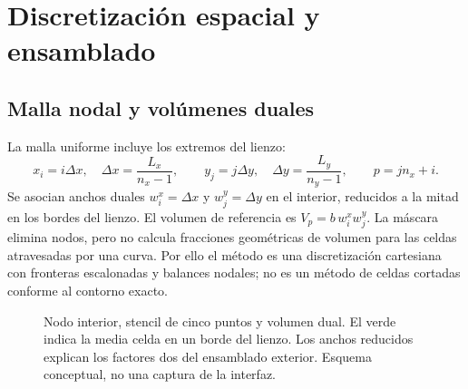 \documentclass[11pt,a4paper]{article}
\begin{document}
\FloatBarrier
\section{Discretización espacial y ensamblado}
\label{sec:space}
\subsection{Malla nodal y volúmenes duales}
La malla uniforme incluye los extremos del lienzo:
\begin{equation}
 x_i=i\Delta x,\quad \Delta x=\frac{L_x}{n_x-1},\qquad
 y_j=j\Delta y,\quad \Delta y=\frac{L_y}{n_y-1},\qquad p=j n_x+i.
\end{equation}
Se asocian anchos duales $w^x_i=\Delta x$ y $w^y_j=\Delta y$ en el interior,
reducidos a la mitad en los bordes del lienzo. El volumen de referencia es
$V_p=b\,w^x_iw^y_j$. La máscara elimina nodos, pero no calcula fracciones
geométricas de volumen para las celdas atravesadas por una curva. Por ello el
método es una discretización cartesiana con fronteras escalonadas y balances
nodales; no es un método de celdas cortadas conforme al contorno exacto.

\begin{figure}[htbp]\centering
{}
\caption{Nodo interior, stencil de cinco puntos y volumen dual. El verde indica
la media celda en un borde del lienzo. Los anchos reducidos explican los
factores dos del ensamblado exterior. Esquema conceptual, no una captura de la interfaz.}
\label{fig:dual}
\end{figure}
\end{document}
